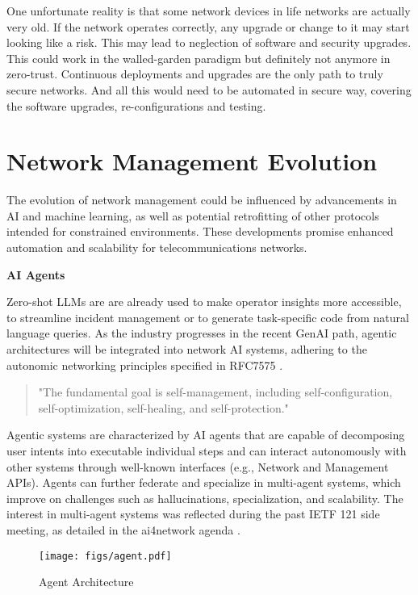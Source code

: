 \documentclass[10pt,sigconf]{iabart}
\begin{document}
One unfortunate reality is that some network devices in life networks are actually very old. If the network operates correctly, any upgrade or change to it may start looking like a risk. This may lead to neglection of software and security upgrades. This could work in the walled-garden paradigm but definitely not anymore in zero-trust. Continuous deployments and upgrades are the only path to truly secure networks. And all this would need to be automated in secure way, covering the software upgrades, re-configurations and testing.

 
\section{Network Management Evolution} \label{insights}

The evolution of network management could be influenced by advancements in AI and machine learning, as well as potential retrofitting of other protocols intended for constrained environments. These developments promise enhanced automation and scalability for telecommunications networks.

\textbf{AI Agents}

Zero-shot LLMs are are already used to make operator insights more accessible, to streamline incident management or to generate task-specific code from natural language queries. As the industry progresses in the recent GenAI path, agentic architectures will be integrated into network AI systems, adhering to the autonomic networking principles specified in RFC7575 \cite{RFC7575}.

\begin{quote}
"The fundamental goal is self-management, including self-configuration, self-optimization, self-healing, and self-protection." 
\end{quote}

Agentic systems are characterized by AI agents that are capable of decomposing user intents into executable individual steps and can interact autonomously with other systems through well-known interfaces (e.g., Network and Management APIs). Agents can further federate and specialize in multi-agent systems, which improve on challenges such as hallucinations, specialization, and scalability. The interest in multi-agent systems was reflected during the past IETF 121 side meeting, as detailed in the ai4network agenda \cite{ai4network-agenda}. 

\begin{figure}[h]
  \centering
  \texttt{[image: figs/agent.pdf]}
  \caption{Agent Architecture}
  \label{fig:agent_architecture}
\end{figure}
\end{document}
